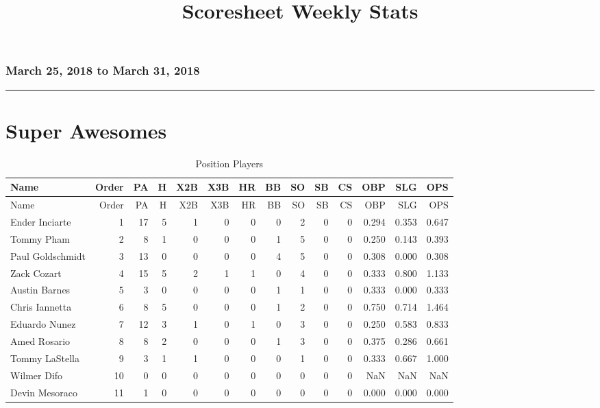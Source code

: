 \documentclass[]{article}
\title{Scoresheet Weekly Stats}
\author{}
\date{}
\begin{document}
\maketitle

\subsubsection{March 25, 2018 to March 31,
2018}\label{march-25-2018-to-march-31-2018}

\begin{center}\rule{0.5\linewidth}{\linethickness}\end{center}

\section{Super Awesomes}\label{super-awesomes}

\begin{longtable}[]{@{}lrrrrrrrrrrrrr@{}}
\caption{Position Players}\tabularnewline
\toprule
Name & Order & PA & H & X2B & X3B & HR & BB & SO & SB & CS & OBP & SLG &
OPS\tabularnewline
\midrule
\endfirsthead
\toprule
Name & Order & PA & H & X2B & X3B & HR & BB & SO & SB & CS & OBP & SLG &
OPS\tabularnewline
\midrule
\endhead
Ender Inciarte & 1 & 17 & 5 & 1 & 0 & 0 & 0 & 2 & 0 & 0 & 0.294 & 0.353
& 0.647\tabularnewline
Tommy Pham & 2 & 8 & 1 & 0 & 0 & 0 & 1 & 5 & 0 & 0 & 0.250 & 0.143 &
0.393\tabularnewline
Paul Goldschmidt & 3 & 13 & 0 & 0 & 0 & 0 & 4 & 5 & 0 & 0 & 0.308 &
0.000 & 0.308\tabularnewline
Zack Cozart & 4 & 15 & 5 & 2 & 1 & 1 & 0 & 4 & 0 & 0 & 0.333 & 0.800 &
1.133\tabularnewline
Austin Barnes & 5 & 3 & 0 & 0 & 0 & 0 & 1 & 1 & 0 & 0 & 0.333 & 0.000 &
0.333\tabularnewline
Chris Iannetta & 6 & 8 & 5 & 0 & 0 & 0 & 1 & 2 & 0 & 0 & 0.750 & 0.714 &
1.464\tabularnewline
Eduardo Nunez & 7 & 12 & 3 & 1 & 0 & 1 & 0 & 3 & 0 & 0 & 0.250 & 0.583 &
0.833\tabularnewline
Amed Rosario & 8 & 8 & 2 & 0 & 0 & 0 & 1 & 3 & 0 & 0 & 0.375 & 0.286 &
0.661\tabularnewline
Tommy LaStella & 9 & 3 & 1 & 1 & 0 & 0 & 0 & 1 & 0 & 0 & 0.333 & 0.667 &
1.000\tabularnewline
Wilmer Difo & 10 & 0 & 0 & 0 & 0 & 0 & 0 & 0 & 0 & 0 & NaN & NaN &
NaN\tabularnewline
Devin Mesoraco & 11 & 1 & 0 & 0 & 0 & 0 & 0 & 0 & 0 & 0 & 0.000 & 0.000
& 0.000\tabularnewline
\bottomrule
\end{longtable}
\end{document}
